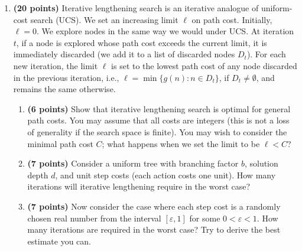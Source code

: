 \documentclass[11pt]{article}
\begin{document}
\begin{enumerate}[leftmargin=*, label=\textbf{\arabic*.}]
By the properties of BFS, before it explores the first goal node, it will not explore any node at depth $d+1$. Therefore, BFS will only explore all nodes from depth $0$ to depth $d$.

At depth $0$, the number of node: 
\[b^0 = 1\]

At depth $1$, the number of nodes:
\[b^1 = b\]

At depth $k$, the number of nodes:
\[b^k\]

BFS will only explore all nodes from depth $0$ to depth $d$.
\[\sum_{k=0}^{d}b^k = 1 + b + b^2 + \dots + b^d = \frac{b^{d+1} - 1}{b - 1}\]

Since $b \ge 2:$
\[\frac{b^{d+1} - 1}{b - 1} \le \frac{b}{b-1}b^d \le 2b^d\]

Thus the number of explored nodes is at most $2b^d$. By the assumption in the problem, each node exploration takes one time step.

Therefore the total running time of BFS is at most $2b^d$, which is $\mathcal{O}(b^d)$.





\newpage
\item \textbf{(20 points)} Iterative lengthening search is an iterative analogue of uniform-cost search (UCS). We set an increasing limit $\ell$ on path cost. Initially, $\ell=0$. We explore nodes in the same way we would under UCS. At iteration $t$, if a node is explored whose path cost exceeds the current limit, it is immediately discarded (we add it to a list of discarded nodes $D_t$). For each new iteration, the limit $\ell$ is set to the lowest path cost of any node discarded in the previous iteration, i.e., $\ell=\min\{g(n):n\in D_t\}$, if $D_t\ne \emptyset$, and remains the same otherwise.

\begin{enumerate}[label=(\alph*), leftmargin=2em]
    \item \textbf{(6 points)} Show that iterative lengthening search is optimal for general path costs. You may assume that all costs are integers (this is not a loss of generality if the search space is finite). You may wish to consider the minimal path cost $C$; what happens when we set the limit to be $\ell<C$?
    \item \textbf{(7 points)} Consider a uniform tree with branching factor $b$, solution depth $d$, and unit step costs (each action costs one unit). How many iterations will iterative lengthening require in the worst case?
    \item \textbf{(7 points)} Now consider the case where each step cost is a randomly chosen real number from the interval $[\varepsilon,1]$ for some $0<\varepsilon<1$. How many iterations are required in the worst case? Try to derive the best estimate you can.
\end{enumerate}


\end{enumerate}
\end{document}
